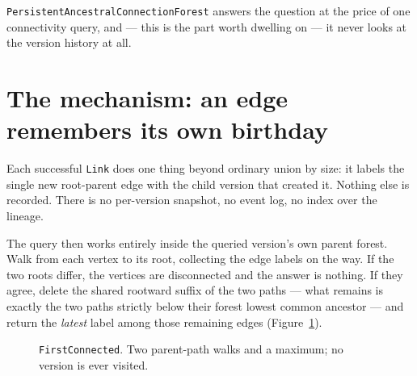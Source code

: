 \documentclass[11pt,twoside,openright]{book}
\newcommand{\code}[1]{\texorpdfstring{\textcolor{d7ink}{\texttt{#1}}}{#1}}
\begin{document}
\code{PersistentAncestralConnectionForest} answers the question at the price of
one connectivity query, and --- this is the part worth dwelling on --- it never
looks at the version history at all.

\section{The mechanism: an edge remembers its own birthday}

Each successful \code{Link} does one thing beyond ordinary union by size: it
labels the single new root-parent edge with the child version that created it.
Nothing else is recorded. There is no per-version snapshot, no event log, no
index over the lineage.

The query then works entirely inside the queried version's own parent forest.
Walk from each vertex to its root, collecting the edge labels on the way. If the
two roots differ, the vertices are disconnected and the answer is nothing. If
they agree, delete the shared rootward suffix of the two paths --- what remains
is exactly the two paths strictly below their forest lowest common ancestor ---
and return the \emph{latest} label among those remaining edges
(Figure~\ref{fig:firstconnected}).

\begin{figure}[htbp]
\centering
{}
\caption{\code{FirstConnected}. Two parent-path walks and a maximum; no version
is ever visited.}
\label{fig:firstconnected}
\end{figure}
\end{document}
